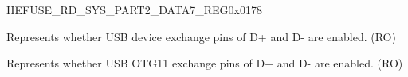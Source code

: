 \begin{register}{H}{EFUSE\_RD\_SYS\_PART2\_DATA7\_REG}{0x0178}\label{regdesc:EFUSERDSYSPART2DATA7REG}
%
%
%
%
\regnewline%
\begin{regdesc}\begin{reglist}
\label{fielddesc:EFUSEUSBDEVICEEXCHGPINS}\item [EFUSE\_USB\_DEVICE\_EXCHG\_PINS] Represents whether USB device exchange pins of D+ and D- are enabled. (RO)
\label{fielddesc:EFUSEUSBOTG11EXCHGPINS}\item [EFUSE\_USB\_OTG11\_EXCHG\_PINS] Represents whether USB OTG11 exchange pins of D+ and D- are enabled. (RO)
\end{reglist}\end{regdesc}
\end{register}


